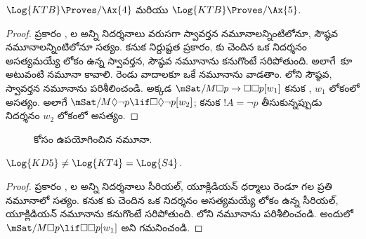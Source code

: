 \documentclass[../../../include/open-logic-section]{subfiles}
\begin{document}
\begin{thm}
  $\Log{KTB} \Proves/ \Ax{4}$ మరియు $\Log{KTB} \Proves/ \Ax{5}$.
\end{thm}

\begin{proof}
   ప్రకారం , ల
  అన్ని నిదర్శనాలు వరుసగా స్వావర్తన నమూనాలన్నింటిలోనూ,
  సౌష్ఠవ నమూనాలన్నింటిలోనూ సత్యం.
  కనుక నిర్దుష్టత ప్రకారం, కు చెందిన ఒక నిదర్శనం అసత్యమయ్యే
  లోకం ఉన్న స్వావర్తన, సౌష్ఠవ నమూనాను కనుగొంటే సరిపోతుంది.
  అలాగే~కూ అటువంటి నమూనా కావాలి. రెండు వాదాలకూ ఒకే
  నమూనాను వాడతాం. లోని సౌష్ఠవ,
  స్వావర్తన నమూనాను పరిశీలించండి. అక్కడ $\mSat/{M}{\Box p \to \Box \Box
    p}[w_1]$ కనుక , $w_1$ లోకంలో అసత్యం. అలాగే
  $\mSat/{M}{\Diamond \lnot p \lif \Box \Diamond \lnot p}[w_2]$;
  కనుక $!A = \lnot p$ తీసుకున్నప్పుడు~ నిదర్శనం $w_2$ లోకంలో అసత్యం.
\end{proof}

\begin{figure}[htpb]
  \centering
  \caption{ కోసం ఉపయోగించిన నమూనా.}
\end{figure}

\begin{thm}
  $\Log{KD5} \neq \Log{KT4} = \Log{S4}$.
\end{thm}

\begin{proof}
   ప్రకారం , ల
  అన్ని నిదర్శనాలు సీరియల్, యూక్లిడియన్ ధర్మాలు రెండూ గల ప్రతి
  నమూనాలో సత్యం.
  కనుక కు చెందిన ఒక నిదర్శనం అసత్యమయ్యే లోకం ఉన్న
  సీరియల్, యూక్లిడియన్ నమూనాను కనుగొంటే సరిపోతుంది.
  లోని నమూనాను పరిశీలించండి. అందులో
  $\mSat/{M}{\Box p \lif \Box\Box p}[w_1]$ అని గమనించండి.
\end{proof}
\end{document}
